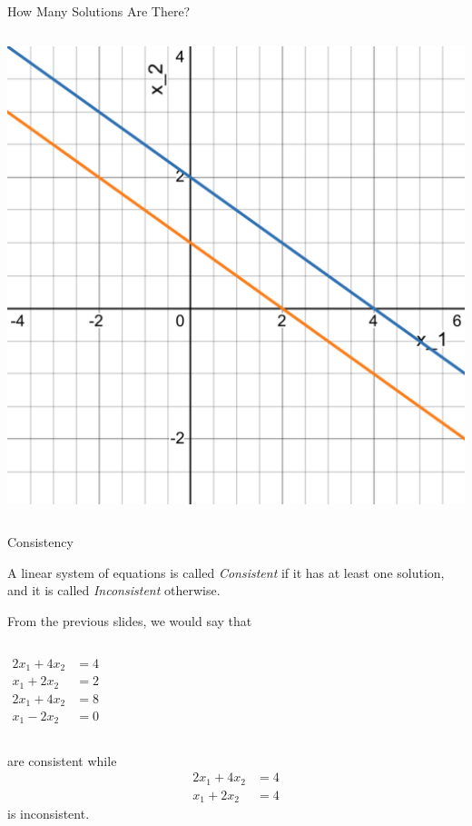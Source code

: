 \documentclass[xcoler=dvipsnames, aspectratio=169]{beamer}
\begin{document}
\begin{frame}{How Many Solutions Are There?}
\begin{columns}
\begin{center}
                \includegraphics[height=.5\textheight]{images/noSolution.pdf}
            \end{center}
    \end{columns}
\end{frame}
\begin{frame}{Consistency}
    \begin{defn}
        A linear system of equations is called \textit{Consistent} if it has at least one solution, 
        and it is called \textit{Inconsistent} otherwise.
    \end{defn}
    \pause
    \begin{ex}
        From the previous slides, we would say that 
        \begin{columns}
            \vspace{-.125in}
            \begin{align*}
                2x_1 + 4x_2 &= 4 \\
                x_1 + 2x_2 &=2
            \end{align*}
            \vspace{-.125in}
            \begin{align*}
                2x_1 + 4x_2 &= 8 \\
                x_1 - 2x_2 &=0
            \end{align*}
        \end{columns}
        are consistent while
        \vspace{-.125in}
        \begin{align*}
            2x_1 + 4x_2 &= 4 \\
            x_1 + 2x_2 &=4
        \end{align*}
        is inconsistent.
    \end{ex}
\end{frame}
\end{document}
